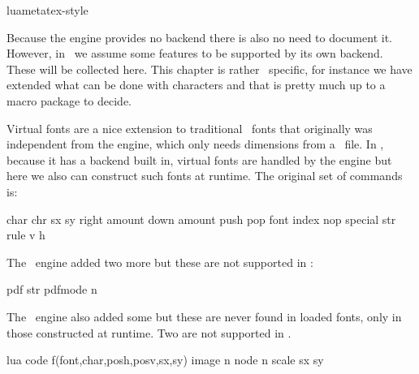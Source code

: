 

\environment luametatex-style

\startdocument[title=Assumptions]

\startsubject[title=Contents]
    \setups[sectioncontents]
\stopsubject

\startsection[title={Introduction}]

Because the engine provides no backend there is also no need to document it.
However, in \CONTEXT\ we assume some features to be supported by its own backend.
These will be collected here. This chapter is rather \CONTEXT\ specific, for
instance we have extended what can be done with characters and that is pretty
much up to a macro package to decide.

\stopsection

\startsection[title=Virtual fonts]

Virtual fonts are a nice extension to traditional \TEX\ fonts that originally was
independent from the engine, which only needs dimensions from a \TFM\ file. In
\LUATEX, because it has a backend built in, virtual fonts are handled by the
engine but here we also can construct such fonts at runtime. The original set of
commands is:

\starttabulate[|w(4em)||||]
\NC char    \NC \textplus  \NC chr sx sy \NC \NC \NR
\NC right   \NC \textplus  \NC amount    \NC \NC \NR
\NC down    \NC \textplus  \NC amount    \NC \NC \NR
\NC push    \NC \textplus  \NC           \NC \NC \NR
\NC pop     \NC \textplus  \NC           \NC \NC \NR
\NC font    \NC \textplus  \NC index     \NC \NC \NR
\NC nop     \NC \textplus  \NC           \NC \NC \NR
\NC special \NC \textminus \NC str       \NC \NC \NR
\NC rule    \NC \textplus  \NC v h       \NC \NC \NR
\stoptabulate

The \PDFTEX\ engine added two more but these are not supported in \CONTEXT:

\starttabulate[|w(4em)||||]
\NC pdf     \NC \textminus \NC str \NC \NC \NR
\NC pdfmode \NC \textminus \NC n   \NC \NC \NR
\stoptabulate

The \LUATEX\ engine also added some but these are never found in loaded fonts,
only in those constructed at runtime. Two are not supported in \CONTEXT.

\starttabulate[|w(4em)||||]
\NC lua     \NC \textplus  \NC code  \NC f(font,char,posh,posv,sx,sy) \NC \NR
\NC image   \NC \textminus \NC n     \NC                              \NC \NR
\NC node    \NC \textplus  \NC n     \NC                              \NC \NR
\NC scale   \NC \textminus \NC sx sy \NC                              \NC \NR
\stoptabulate

